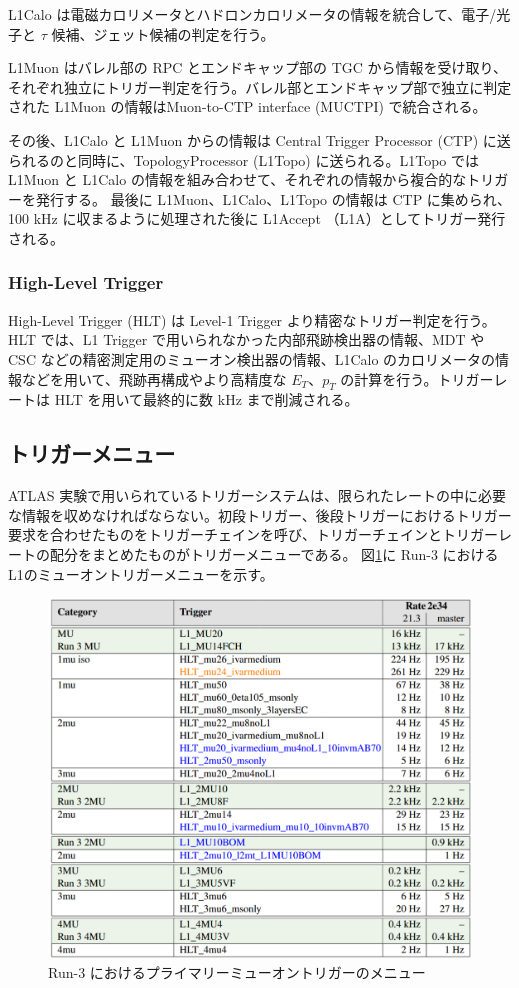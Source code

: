 L1Calo は電磁カロリメータとハドロンカロリメータの情報を統合して、電子/光子と $\tau$ 候補、ジェット候補の判定を行う。

L1Muon はバレル部の RPC とエンドキャップ部の TGC から情報を受け取り、それぞれ独立にトリガー判定を行う。バレル部とエンドキャップ部で独立に判定された L1Muon の情報はMuon-to-CTP interface (MUCTPI) で統合される。

その後、L1Calo と L1Muon からの情報は Central Trigger Processor (CTP) に送られるのと同時に、TopologyProcessor (L1Topo) に送られる。L1Topo では L1Muon と L1Calo の情報を組み合わせて、それぞれの情報から複合的なトリガーを発行する。
最後に L1Muon、L1Calo、L1Topo の情報は CTP に集められ、100 kHz に収まるように処理された後に L1Accept （L1A）としてトリガー発行される。

\subsubsection{High-Level Trigger}
High-Level Trigger (HLT) は Level-1 Trigger より精密なトリガー判定を行う。
HLT では、L1 Trigger で用いられなかった内部飛跡検出器の情報、MDT や CSC などの精密測定用のミューオン検出器の情報、L1Calo のカロリメータの情報などを用いて、飛跡再構成やより高精度な $E_T$、$p_T$ の計算を行う。トリガーレートは HLT を用いて最終的に数 kHz まで削減される。

\subsection{トリガーメニュー}
ATLAS 実験で用いられているトリガーシステムは、限られたレートの中に必要な情報を収めなければならない。初段トリガー、後段トリガーにおけるトリガー要求を合わせたものをトリガーチェインを呼び、トリガーチェインとトリガーレートの配分をまとめたものがトリガーメニューである。
図\ref{fig:muon_trigger_menu.pdf}に Run-3 におけるL1のミューオントリガーメニューを示す。
\begin{figure}[b]
  \centering
  \includegraphics[clip, width=14cm]{fig/2/muon_trigger_menu.pdf}
  \caption{Run-3 におけるプライマリーミューオントリガーのメニュー}
  \label{fig:muon_trigger_menu.pdf}
\end{figure}

